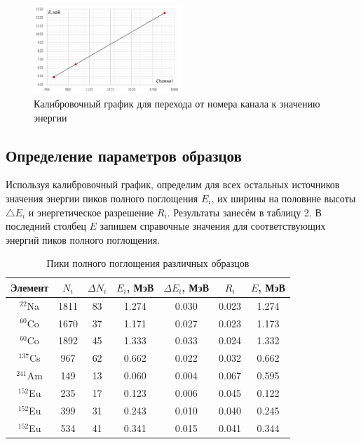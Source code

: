 \documentclass[a4paper]{article}
\begin{document}
\begin{figure}[!ht]
    \begin{center}
        \includegraphics[width = 0.5\textwidth]{image/gr1.png}
        \caption{Калибровочный график для перехода от номера канала к значению энергии}
    \end{center}
\end{figure}


\subsection {Определение параметров образцов}

\noindent Используя калибровочный график, определим для всех остальных источников значения энергии пиков полного поглощения $E_i$, их ширины на половине высоты $\triangle E_i$ и энергетическое разрешение $R_i$. Результаты занесём в таблицу 2. В последний столбец $E$ запишем справочные значения для соответствующих энергий пиков полного поглощения.

\begin{table}[h]
    \centering
    \caption{Пики полного поглощения различных образцов}
    \label{tab:my_label}
    \begin{tabular}{|c|c|c|c|c|c|c|}
\hline
  Элемент & $N_i$ & $\Delta N_i$ & $E_i$, МэВ & $\Delta E_i$, МэВ & $R_i$ & $E$, МэВ \\
 \hline
 $^{22}$Na & 1811 & 83 & 1.274 & 0.030 & 0.023 & 1.274  \\
\hline
 $^{60}$Co & 1670 & 37 & 1.171 & 0.027 & 0.023  & 1.173 \\
\hline
 $^{60}$Co & 1892 & 45 & 1.333 & 0.033 & 0.024 & 1.332 \\
\hline
$^{137}$Cs & 967 & 62 & 0.662 & 0.022 & 0.032 & 0.662  \\
\hline
$^{241}$Am & 149 & 13 & 0.060 & 0.004 & 0.067 & 0.595 \\
\hline
$^{152}$Eu & 235 & 17 & 0.123 & 0.006 & 0.045 & 0.122 \\
\hline
$^{152}$Eu & 399 & 31 & 0.243 & 0.010 & 0.040 & 0.245 \\
\hline
$^{152}$Eu & 534 & 41 & 0.341 & 0.015 & 0.041 & 0.344 \\
\hline
 \end{tabular}
\end{table} 
\end{document}
